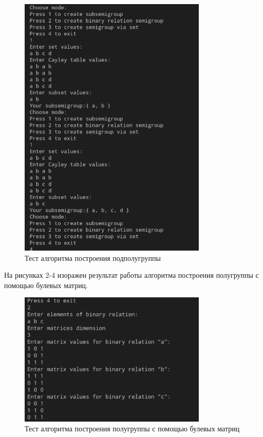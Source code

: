 \documentclass[bachelor, och, labwork]{shiza}
\begin{document}
      \begin{figure}[H]
        \centering
        \includegraphics[width=0.8\textwidth]{photo/1.png}
        \caption{Тест алгоритма построения подполугруппы}
      \end{figure}

      На рисунках 2-4 изоражен результат работы алгоритма построения полугруппы с помощью булевых матриц.

      \begin{figure}[H]
        \centering
        \includegraphics[width=0.8\textwidth]{photo/2.png}
        \caption{Тест алгоритма построения полугруппы с помощью булевых матриц}
      \end{figure}
\end{document}

